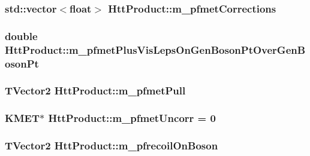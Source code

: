 \label{classHttProduct_aa99f9a9c423fc8188938dcc0155da4c4}
\hypertarget{classHttProduct_a8da5000e9a19e09d4495b8d81d4c67c9}{
\subsubsection[{m\_\-pfmetCorrections}]{\setlength{\rightskip}{0pt plus 5cm}std::vector$<$float$>$ {\bf HttProduct::m\_\-pfmetCorrections}}}
\label{classHttProduct_a8da5000e9a19e09d4495b8d81d4c67c9}
\hypertarget{classHttProduct_ae3ef7216b4923322f5f2bae4e4631691}{
\subsubsection[{m\_\-pfmetPlusVisLepsOnGenBosonPtOverGenBosonPt}]{\setlength{\rightskip}{0pt plus 5cm}double {\bf HttProduct::m\_\-pfmetPlusVisLepsOnGenBosonPtOverGenBosonPt}}}
\label{classHttProduct_ae3ef7216b4923322f5f2bae4e4631691}
\hypertarget{classHttProduct_af0871f430337a0e9afd9142e2c685332}{
\subsubsection[{m\_\-pfmetPull}]{\setlength{\rightskip}{0pt plus 5cm}TVector2 {\bf HttProduct::m\_\-pfmetPull}}}
\label{classHttProduct_af0871f430337a0e9afd9142e2c685332}
\hypertarget{classHttProduct_a9c2604be85c44fc57f7fa3fd067a9a8f}{
\subsubsection[{m\_\-pfmetUncorr}]{\setlength{\rightskip}{0pt plus 5cm}KMET$\ast$ {\bf HttProduct::m\_\-pfmetUncorr} = 0}}
\label{classHttProduct_a9c2604be85c44fc57f7fa3fd067a9a8f}
\hypertarget{classHttProduct_ac875645551f9928222a8f22f2487b444}{
\subsubsection[{m\_\-pfrecoilOnBoson}]{\setlength{\rightskip}{0pt plus 5cm}TVector2 {\bf HttProduct::m\_\-pfrecoilOnBoson}}}
